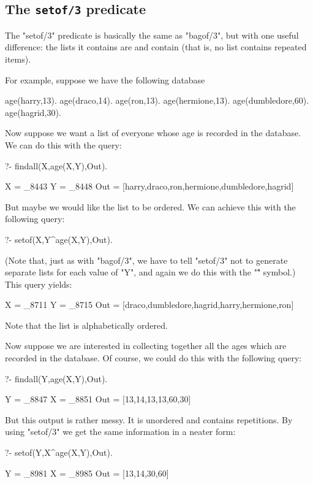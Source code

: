 \subsection*{The {\tt setof/3} predicate}\label{SUBSEC.L11.SETOF}

The "setof/3" predicate is basically the same as
"bagof/3", but with one useful difference: the lists it contains
are  and contain  (that is,
no list contains repeated items).

For example, suppose we have the following database
\begin{LPNcodedisplay}
age(harry,13).
age(draco,14).
age(ron,13).
age(hermione,13).
age(dumbledore,60).
age(hagrid,30).
\end{LPNcodedisplay}

Now suppose we want a list of everyone whose
age is recorded in the database. We can do this
with the query:
\begin{LPNcodedisplay}
?- findall(X,age(X,Y),Out).

X = _8443
Y = _8448
Out = [harry,draco,ron,hermione,dumbledore,hagrid]
\end{LPNcodedisplay}


But maybe we would like the list to be ordered. We can achieve
this with the following query:
\begin{LPNcodedisplay}
?- setof(X,Y^age(X,Y),Out).
\end{LPNcodedisplay}
(Note that, just as with "bagof/3", we have to tell "setof/3" not to
generate separate lists for each value of "Y", and again we do
this with the "\^" symbol.)
This query yields:
\begin{LPNcodedisplay}
X = _8711
Y = _8715
Out = [draco,dumbledore,hagrid,harry,hermione,ron]
\end{LPNcodedisplay}
Note that the list is alphabetically ordered.

Now suppose we are interested in collecting together all the ages
which are recorded in the database.  Of course, we could do this with the
following query:
\begin{LPNcodedisplay}
?- findall(Y,age(X,Y),Out).

Y = _8847
X = _8851
Out = [13,14,13,13,60,30]
\end{LPNcodedisplay}

But this output is rather messy. It is unordered and contains
repetitions.  By using "setof/3" we get the same information in a neater
form:
\begin{LPNcodedisplay}
?- setof(Y,X^age(X,Y),Out).

Y = _8981
X = _8985
Out = [13,14,30,60]
\end{LPNcodedisplay}


